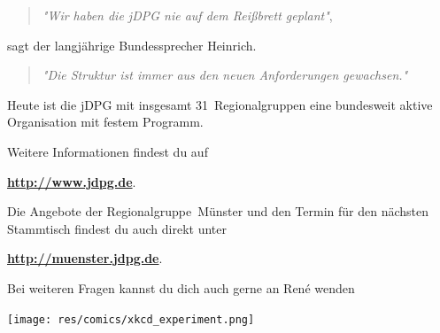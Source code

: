 \begin{multicols}{2}
\begin{quote}
\textit{"Wir haben die jDPG nie auf dem Reißbrett geplant"},
\end{quote}
sagt der langjährige Bundessprecher Heinrich.
\begin{quote}
\textit{"Die Struktur ist immer aus den neuen Anforderungen gewachsen."}
\end{quote}

Heute ist die jDPG mit insgesamt 31~Regionalgruppen eine bundesweit aktive Organisation mit festem Programm.

Weitere Informationen findest du auf

\begin{center}
\textbf{\url{http://www.jdpg.de}}.
\end{center}

Die Angebote der Regionalgruppe~Münster und den Termin für den nächsten Stammtisch findest du auch direkt unter

\begin{center}
\textbf{\url{http://muenster.jdpg.de}}.
\end{center}

Bei weiteren Fragen kannst du dich auch gerne an René wenden

\begin{center}
\textbf{}
\end{center}


\end{multicols}

\begin{center}
\texttt{[image: res/comics/xkcd\_experiment.png]}
\end{center}